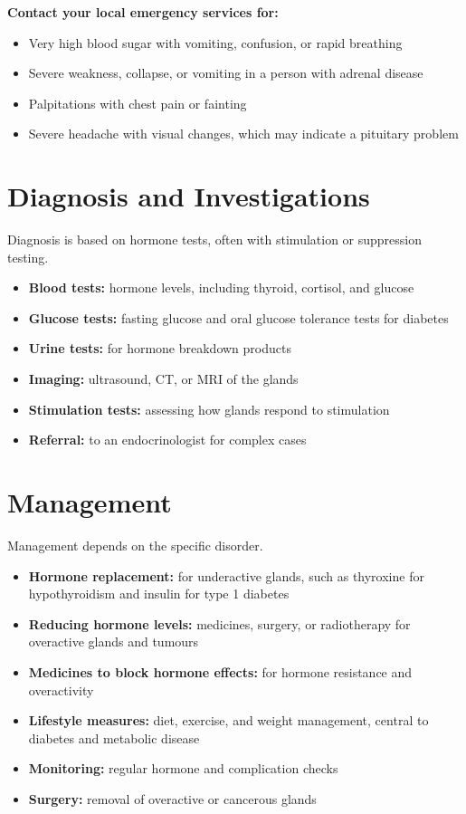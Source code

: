 \textbf{Contact your local emergency services for:}
\begin{itemize}
    \item Very high blood sugar with vomiting, confusion, or rapid breathing
    \item Severe weakness, collapse, or vomiting in a person with adrenal disease
    \item Palpitations with chest pain or fainting
    \item Severe headache with visual changes, which may indicate a pituitary problem
\end{itemize}

\section*{Diagnosis and Investigations}
Diagnosis is based on hormone tests, often with stimulation or suppression testing.
\begin{itemize}
    \item \textbf{Blood tests:} hormone levels, including thyroid, cortisol, and glucose
    \item \textbf{Glucose tests:} fasting glucose and oral glucose tolerance tests for diabetes
    \item \textbf{Urine tests:} for hormone breakdown products
    \item \textbf{Imaging:} ultrasound, CT, or MRI of the glands
    \item \textbf{Stimulation tests:} assessing how glands respond to stimulation
    \item \textbf{Referral:} to an endocrinologist for complex cases
\end{itemize}

\section*{Management}
Management depends on the specific disorder.
\begin{itemize}
    \item \textbf{Hormone replacement:} for underactive glands, such as thyroxine for hypothyroidism and insulin for type 1 diabetes
    \item \textbf{Reducing hormone levels:} medicines, surgery, or radiotherapy for overactive glands and tumours
    \item \textbf{Medicines to block hormone effects:} for hormone resistance and overactivity
    \item \textbf{Lifestyle measures:} diet, exercise, and weight management, central to diabetes and metabolic disease
    \item \textbf{Monitoring:} regular hormone and complication checks
    \item \textbf{Surgery:} removal of overactive or cancerous glands
\end{itemize}

